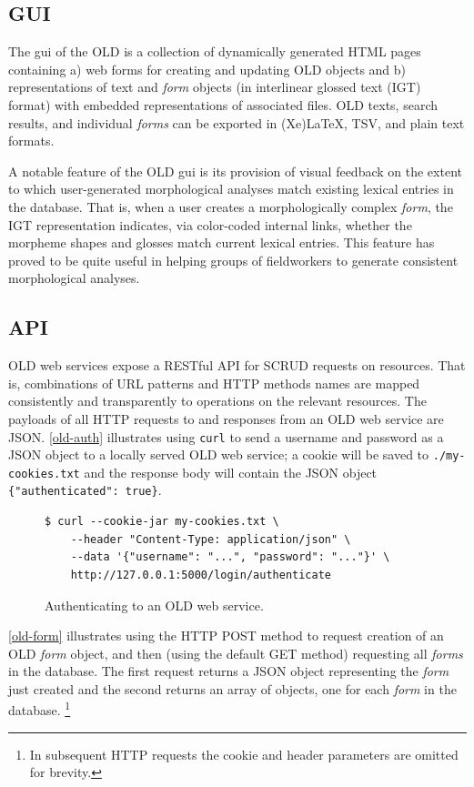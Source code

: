 \documentclass[11pt]{article}
\begin{document}
\subsection{GUI}

The \gls{gui} of the OLD %
is a collection of dynamically generated HTML pages containing a) web forms for
creating and updating OLD objects and b) representations of text and
\emph{form} objects (in interlinear glossed text (IGT) format) with embedded
representations of associated files. OLD texts, search results, and individual
\emph{forms} can be exported in (Xe)LaTeX, TSV, and plain text formats.

A notable feature of the OLD \gls{gui} is its provision of visual feedback on the
extent to which user-generated morphological analyses match existing lexical
entries in the database. That is, when a user creates a morphologically complex
\emph{form}, the IGT representation indicates, via color-coded internal links,
whether the morpheme shapes and glosses match current lexical entries. This
feature has proved to be quite useful in helping groups of fieldworkers to
generate consistent morphological analyses.


\subsection{API}

OLD web services expose a RESTful API for SCRUD requests on resources. That is,
combinations of URL patterns and HTTP methods names are mapped consistently and
transparently to operations on the relevant resources. The payloads of all HTTP
requests to and responses from an OLD web service are JSON. \autoref{old-auth}
illustrates using \texttt{curl} to send a username and password as a JSON object
to a locally served OLD web service; a cookie will be saved to \texttt{./my-cookies.txt} and
the response body will contain the JSON object \texttt{\{"authenticated":
true\}}.

\begin{figure}[h]
\scriptsize
\begin{verbatim}
$ curl --cookie-jar my-cookies.txt \
    --header "Content-Type: application/json" \
    --data '{"username": "...", "password": "..."}' \
    http://127.0.0.1:5000/login/authenticate
\end{verbatim}
\normalsize
\caption{Authenticating to an OLD web service.}
\label{old-auth}
\end{figure}

\autoref{old-form} illustrates using the HTTP POST method to request creation
of an OLD \emph{form} object, and then (using the default GET method) requesting all
\emph{forms} in the database. The first request returns a JSON object representing the
\emph{form} just created and the second returns an array of objects, one for each \emph{form}
in the database.%
\footnote{In subsequent HTTP requests the cookie and header parameters are
omitted for brevity.}
\end{document}
